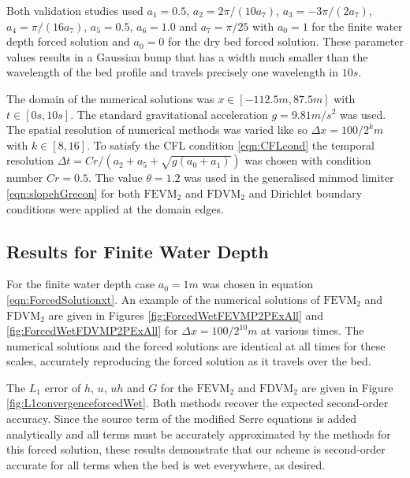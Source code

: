 Both validation studies used $a_1 = 0.5$, $a_2 = 2 \pi / \left(10 a_7\right)$, $a_3 = - 3\pi/ \left(2 a_7\right)$, $a_4 = \pi / (16 a_7)$, $a_5 = 0.5$, $a_6 = 1.0$ and $a_7 = \pi / 25$ with $a_0= 1$ for the finite water depth forced solution and $a_0=0$ for the dry bed forced solution. These parameter values results in a Gaussian bump that has a width much smaller than the wavelength of the bed profile and travels precisely one wavelength in $10s$.

The domain of the numerical solutions was $x \in \left[-112.5 m,87.5 m\right]$ with $t \in \left[0s,10s\right]$. The standard gravitational acceleration $g= 9.81 m/s^2$ was used. The spatial resolution of numerical methods was varied like so $\Delta x = 100 / 2^k m$ with $k \in \left[8,16\right]$. To satisfy the CFL condition \eqref{eqn:CFLcond} the temporal resolution
$\Delta t = Cr / \left(a_2 + a_5 + \sqrt{g\left(a_0 + a_1\right)}\right)$ was chosen with condition number $Cr = 0.5$. The value $\theta = 1.2$ was used in the generalised minmod limiter \eqref{eqn:slopehGrecon} for both $\text{FEVM}_2$ and $\text{FDVM}_2$ and Dirichlet boundary conditions were applied at the domain edges. 


\subsection{Results for Finite Water Depth} 
For the finite water depth case $a_0 = 1m$ was chosen in equation \eqref{eqn:ForcedSolutionxt}. An example of the numerical solutions of $\text{FEVM}_2$ and $\text{FDVM}_2$ are given in Figures \ref{fig:ForcedWetFEVMP2PExAll} and \ref{fig:ForcedWetFDVMP2PExAll} for $\Delta x = 100/ 2^{10} m$ at various times. The numerical solutions and the forced solutions are identical at all times for these scales, accurately reproducing the forced solution as it travels over the bed.

The $L_1$ error of $h$, $u$, $uh$ and $G$ for the $\text{FEVM}_2$ and $\text{FDVM}_2$ are given in Figure \ref{fig:L1convergenceforcedWet}. Both methods recover the expected second-order accuracy. Since the source term of the modified Serre equations is added analytically and all terms must be accurately approximated by the methods for this forced solution, these results demonstrate that our scheme is second-order accurate for all terms when the bed is wet everywhere, as desired.

